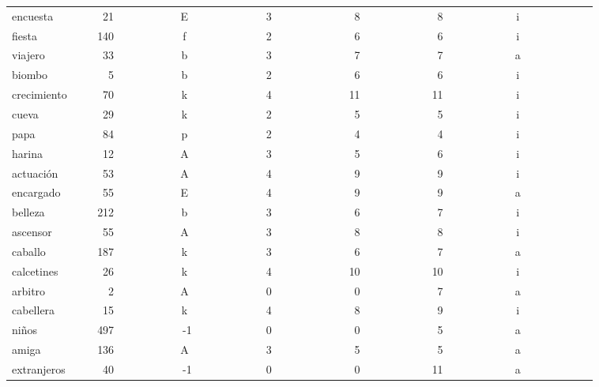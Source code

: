 \begin{longtable}{|l|c|c|c|c|c|c|}
encuesta~~~~~&~21~~~~~~~~~~&E~~~~~~~~~~~~&3~~~~~~~~~~~~&~8~~~~~~~~~~~&~8~~~~~~~~~~~&i~~~~~~~~~~~~\\ 
fiesta~~~~~~~&140~~~~~~~~~~&f~~~~~~~~~~~~&2~~~~~~~~~~~~&~6~~~~~~~~~~~&~6~~~~~~~~~~~&i~~~~~~~~~~~~\\ 
viajero~~~~~~&~33~~~~~~~~~~&b~~~~~~~~~~~~&3~~~~~~~~~~~~&~7~~~~~~~~~~~&~7~~~~~~~~~~~&a~~~~~~~~~~~~\\ 
biombo~~~~~~~&~~5~~~~~~~~~~&b~~~~~~~~~~~~&2~~~~~~~~~~~~&~6~~~~~~~~~~~&~6~~~~~~~~~~~&i~~~~~~~~~~~~\\ 
crecimiento~~&~70~~~~~~~~~~&k~~~~~~~~~~~~&4~~~~~~~~~~~~&11~~~~~~~~~~~&11~~~~~~~~~~~&i~~~~~~~~~~~~\\ 
cueva~~~~~~~~&~29~~~~~~~~~~&k~~~~~~~~~~~~&2~~~~~~~~~~~~&~5~~~~~~~~~~~&~5~~~~~~~~~~~&i~~~~~~~~~~~~\\ 
papa~~~~~~~~~&~84~~~~~~~~~~&p~~~~~~~~~~~~&2~~~~~~~~~~~~&~4~~~~~~~~~~~&~4~~~~~~~~~~~&i~~~~~~~~~~~~\\ 
harina~~~~~~~&~12~~~~~~~~~~&A~~~~~~~~~~~~&3~~~~~~~~~~~~&~5~~~~~~~~~~~&~6~~~~~~~~~~~&i~~~~~~~~~~~~\\ 
actuaci\'{o}n~~~~&~53~~~~~~~~~~&A~~~~~~~~~~~~&4~~~~~~~~~~~~&~9~~~~~~~~~~~&~9~~~~~~~~~~~&i~~~~~~~~~~~~\\ 
encargado~~~~&~55~~~~~~~~~~&E~~~~~~~~~~~~&4~~~~~~~~~~~~&~9~~~~~~~~~~~&~9~~~~~~~~~~~&a~~~~~~~~~~~~\\ 
belleza~~~~~~&212~~~~~~~~~~&b~~~~~~~~~~~~&3~~~~~~~~~~~~&~6~~~~~~~~~~~&~7~~~~~~~~~~~&i~~~~~~~~~~~~\\ 
ascensor~~~~~&~55~~~~~~~~~~&A~~~~~~~~~~~~&3~~~~~~~~~~~~&~8~~~~~~~~~~~&~8~~~~~~~~~~~&i~~~~~~~~~~~~\\ 
caballo~~~~~~&187~~~~~~~~~~&k~~~~~~~~~~~~&3~~~~~~~~~~~~&~6~~~~~~~~~~~&~7~~~~~~~~~~~&a~~~~~~~~~~~~\\ 
calcetines~~~&~26~~~~~~~~~~&k~~~~~~~~~~~~&4~~~~~~~~~~~~&10~~~~~~~~~~~&10~~~~~~~~~~~&i~~~~~~~~~~~~\\ 
arbitro~~~~~~&~~2~~~~~~~~~~&A~~~~~~~~~~~~&0~~~~~~~~~~~~&~0~~~~~~~~~~~&~7~~~~~~~~~~~&a~~~~~~~~~~~~\\ 
cabellera~~~~&~15~~~~~~~~~~&k~~~~~~~~~~~~&4~~~~~~~~~~~~&~8~~~~~~~~~~~&~9~~~~~~~~~~~&i~~~~~~~~~~~~\\ 
ni\~{n}os~~~~~~~~&497~~~~~~~~~~&-1~~~~~~~~~~~&0~~~~~~~~~~~~&~0~~~~~~~~~~~&~5~~~~~~~~~~~&a~~~~~~~~~~~~\\ 
amiga~~~~~~~~&136~~~~~~~~~~&A~~~~~~~~~~~~&3~~~~~~~~~~~~&~5~~~~~~~~~~~&~5~~~~~~~~~~~&a~~~~~~~~~~~~\\ 
extranjeros~~&~40~~~~~~~~~~&-1~~~~~~~~~~~&0~~~~~~~~~~~~&~0~~~~~~~~~~~&11~~~~~~~~~~~&a~~~~~~~~~~~~\\ 

\end{longtable}
